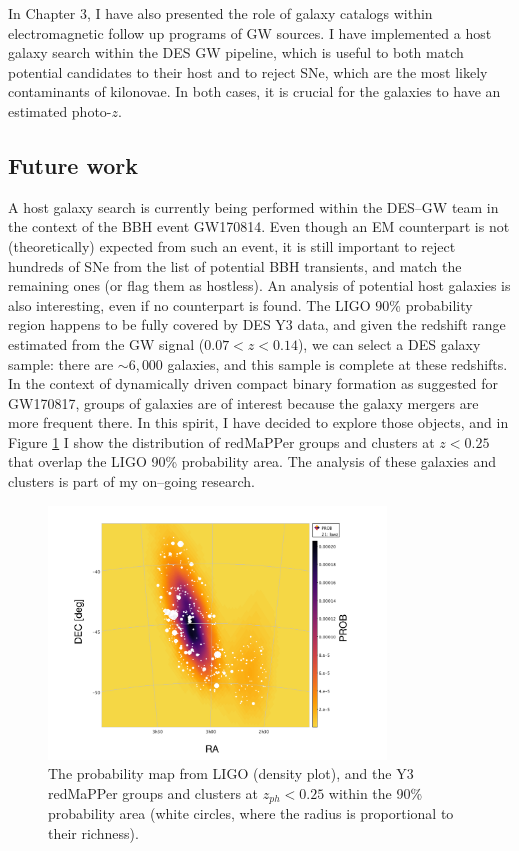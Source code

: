 In Chapter 3, I have also presented the role of galaxy catalogs within electromagnetic follow up programs of GW sources. I have implemented a host galaxy search within the DES GW pipeline, which is useful to both match potential candidates to their host and to reject SNe, which are the most likely contaminants of kilonovae. In both cases, it is crucial for the galaxies to have an estimated photo-$z$. 

\subsection{Future work}
A host galaxy search is currently being performed within the DES--GW team in the context of the BBH event GW170814. Even though an EM counterpart is not (theoretically) expected from such an event, it is still important to reject hundreds of SNe from the list of potential BBH transients, and match the remaining ones (or flag them as hostless). An analysis of potential host galaxies is also interesting, even if no counterpart is found. The LIGO 90\% probability region happens to be fully covered by DES Y3 data, and given the redshift range estimated from the GW signal ($0.07<z<0.14$), we can select a DES galaxy sample: there are $\sim 6,000$ galaxies, and this sample is complete at these redshifts. In the context of dynamically driven compact binary formation as suggested for GW170817, groups of galaxies are of interest because the galaxy mergers are more frequent there. In this spirit, I have decided to explore those objects, and in Figure \ref{fig:GW170814} I show the distribution of redMaPPer groups and clusters at $z<0.25$ that overlap the LIGO 90\% probability area. The analysis of these galaxies and clusters is part of my on--going research. 

\begin{figure}
\centering
\includegraphics[width=0.8\textwidth]{./chapters/chapter8/GW170814.pdf}
\caption{The probability map from LIGO (density plot), and the Y3 redMaPPer groups and clusters at $z_{ph}<0.25$ within the 90\% probability area (white circles, where the radius is proportional to their richness).}\label{fig:GW170814}\end{figure}


